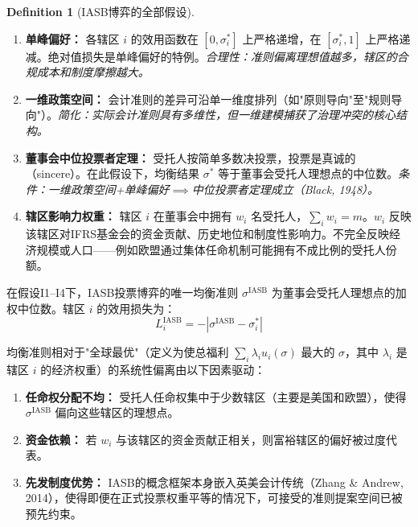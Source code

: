 \documentclass[12pt,a4paper]{ctexart}
\theoremstyle{definition}
\newtheorem{definition}{Definition}[section]
\theoremstyle{remark}
\begin{document}
\begin{definition}[IASB博弈的全部假设]
\label{def:iasb-assumptions}
\begin{enumerate}[label=\textbf{I\arabic*}, leftmargin=*, itemsep=4pt]
\item \textbf{单峰偏好：} 各辖区 $i$ 的效用函数在 $[0, \sigma_i^*]$ 上严格递增，在 $[\sigma_i^*, 1]$ 上严格递减。绝对值损失是单峰偏好的特例。\hfill\textit{合理性：准则偏离理想值越多，辖区的合规成本和制度摩擦越大。}

\item \textbf{一维政策空间：} 会计准则的差异可沿单一维度排列（如"原则导向"至"规则导向"）。\hfill\textit{简化：实际会计准则具有多维性，但一维建模捕获了治理冲突的核心结构。}

\item \textbf{董事会中位投票者定理：} 受托人按简单多数决投票，投票是真诚的（sincere）。在此假设下，均衡结果 $\sigma^*$ 等于董事会受托人理想点的中位数。\hfill\textit{条件：一维政策空间+单峰偏好$\implies$中位投票者定理成立（Black, 1948）。}

\item \textbf{辖区影响力权重：} 辖区 $i$ 在董事会中拥有 $w_i$ 名受托人，$\sum_i w_i = m$。$w_i$ 反映该辖区对IFRS基金会的资金贡献、历史地位和制度性影响力。不完全反映经济规模或人口——例如欧盟通过集体任命机制可能拥有不成比例的受托人份额。
\end{enumerate}
\end{definition}

\begin{proposition}[IASB准则选择的均衡偏离]
\label{prop:iasb-bias}
在假设I1--I4下，IASB投票博弈的唯一均衡准则 $\sigma^{\text{IASB}}$ 为董事会受托人理想点的加权中位数。辖区 $i$ 的效用损失为：
\begin{equation}
L_i^{\text{IASB}} = -|\sigma^{\text{IASB}} - \sigma_i^*|
\end{equation}

均衡准则相对于"全球最优"（定义为使总福利 $\sum_i \lambda_i u_i(\sigma)$ 最大的 $\sigma$，其中 $\lambda_i$ 是辖区 $i$ 的经济权重）的系统性偏离由以下因素驱动：
\begin{enumerate}[label=(\roman*)]
\item \textbf{任命权分配不均：} 受托人任命权集中于少数辖区（主要是美国和欧盟），使得 $\sigma^{\text{IASB}}$ 偏向这些辖区的理想点。
\item \textbf{资金依赖：} 若 $w_i$ 与该辖区的资金贡献正相关，则富裕辖区的偏好被过度代表。
\item \textbf{先发制度优势：} IASB的概念框架本身嵌入英美会计传统（Zhang \& Andrew, 2014），使得即便在正式投票权重平等的情况下，可接受的准则提案空间已被预先约束。
\end{enumerate}
\end{proposition}
\end{document}
